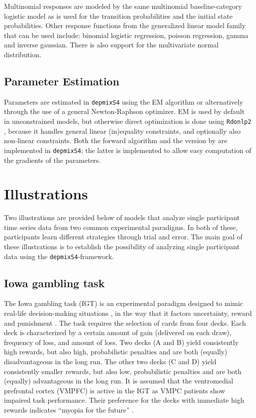 \documentclass[a4paper,12pt,man]{apa} %
\newcommand{\citep}{\cite}
\newcommand{\citet}{\citeA}
\newcommand{\pkg}{\texttt}
\begin{document}
Multinomial responses are modeled by the same multinomial 
baseline-category logistic model as is used for the transition 
probabilities and the initial state probabilities. Other response 
functions from the generalized linear model family that can be used 
include: binomial logistic regression, poisson regression, gamma and 
inverse gaussian. There is also support for the multivariate normal 
distribution. 


\subsection{Parameter Estimation}

Parameters are estimated in \pkg{depmixS4} using the EM algorithm or
alternatively through the use of a general Newton-Raphson optimizer.
EM is used by default in unconstrained models, but otherwise direct
optimization is done using \pkg{Rdonlp2}
\cite{Tamura2007,Spellucci2002}, because it handles general linear
(in)equality constraints, and optionally also non-linear constraints.
Both the forward algorithm \citep{Baum1966,Rabiner1989} and the
version by \citet{Lystig2002} are implemented in \pkg{depmixS4}; the
latter is implemented to allow easy computation of the gradients of
the parameters.


\section{Illustrations}

Two illustrations are provided below of models that analyze single
participant time series data from two common experimental paradigms.
In both of these, participants learn different strategies through
trial and error.  The main goal of these illustrations is to establish
the possibility of analyzing single participant data using the
\pkg{depmixS4}-framework.

\subsection{Iowa gambling task}

The Iowa gambling task (IGT) is an experimental paradigm designed to
mimic real-life decision-making situations \cite{Bechara1994}, in the
way that it factors uncertainty, reward and punishment
\cite{Dunn2006}.  The task requires the selection of cards from four
decks.  Each deck is characterized by a certain amount of gain
(delivered on each draw), frequency of loss, and amount of loss.  Two
decks (A and B) yield consistently high rewards, but also high,
probabilistic penalties and are both (equally) disadvantageous in the
long run.  The other two decks (C and D) yield consistently smaller
rewards, but also low, probabilistic penalties and are both (equally)
advantageous in the long run.  It is assumed that the ventromedial
prefrontal cortex (VMPFC) is active in the IGT as VMPC patients show
impaired task performance.  Their preference for the decks with
immediate high rewards indicates ``myopia for the future''
\cite{Bechara1994}.
\end{document}
